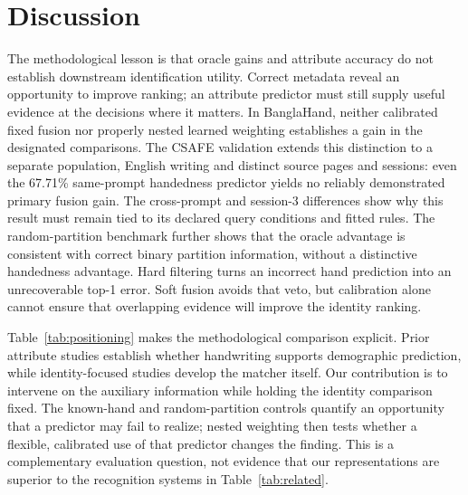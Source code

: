 \section{Discussion}
The methodological lesson is that oracle gains and attribute accuracy do not establish downstream identification utility. Correct metadata reveal an opportunity to improve ranking; an attribute predictor must still supply useful evidence at the decisions where it matters. In BanglaHand, neither calibrated fixed fusion nor properly nested learned weighting establishes a gain in the designated comparisons. The CSAFE validation extends this distinction to a separate population, English writing and distinct source pages and sessions: even the 67.71\% same-prompt handedness predictor yields no reliably demonstrated primary fusion gain. The cross-prompt and session-3 differences show why this result must remain tied to its declared query conditions and fitted rules. The random-partition benchmark further shows that the oracle advantage is consistent with correct binary partition information, without a distinctive handedness advantage. Hard filtering turns an incorrect hand prediction into an unrecoverable top-1 error. Soft fusion avoids that veto, but calibration alone cannot ensure that overlapping evidence will improve the identity ranking.

Table~\ref{tab:positioning} makes the methodological comparison explicit. Prior attribute studies establish whether handwriting supports demographic prediction, while identity-focused studies develop the matcher itself. Our contribution is to intervene on the auxiliary information while holding the identity comparison fixed. The known-hand and random-partition controls quantify an opportunity that a predictor may fail to realize; nested weighting then tests whether a flexible, calibrated use of that predictor changes the finding. This is a complementary evaluation question, not evidence that our representations are superior to the recognition systems in Table~\ref{tab:related}.

